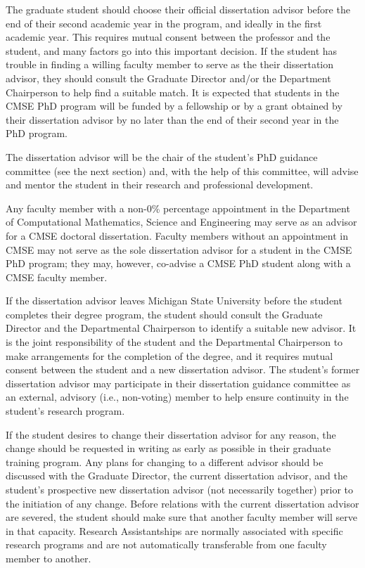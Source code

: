 The graduate student should choose their official dissertation advisor
before the end of their second academic year in the program, and
ideally in the first academic year.  This requires mutual consent
between the professor and the student, and many factors go into this
important decision.  If the student has trouble in finding a willing
faculty member to serve as the their dissertation advisor, they should
consult the Graduate Director and/or the Department Chairperson to
help find a suitable match.  It is expected that students in the CMSE
PhD program will be funded by a fellowship or by a grant obtained by
their dissertation advisor by no later than the end of their second
year in the PhD program.

The dissertation advisor will be the chair of the student's PhD
guidance committee (see the next section) and, with the help of this
committee, will advise and mentor the student in their research and
professional development.  

Any faculty member with a non-0\% percentage appointment in the
Department of Computational Mathematics, Science and Engineering may
serve as an advisor for a CMSE doctoral dissertation.  Faculty members
without an appointment in CMSE may not serve as the sole dissertation
advisor for a student in the CMSE PhD program; they may, however,
co-advise a CMSE PhD student along with a CMSE faculty member.

If the dissertation advisor leaves Michigan State University before the
student completes their degree program, the student should consult
the Graduate Director and the Departmental Chairperson to identify a
suitable new advisor.  It is the joint responsibility of the
student and the Departmental Chairperson to make arrangements for the
completion of the degree, and it requires mutual consent between the
student and a new dissertation advisor.  The student's former
dissertation advisor may participate in their dissertation guidance
committee as an external, advisory (i.e., non-voting) member to help
ensure continuity in the student's research program.

If the student desires to change their dissertation advisor for any
reason, the change should be requested in writing as early as possible in their
graduate training program.  Any plans for changing to a different
advisor should be discussed with the Graduate Director, 
 the current dissertation advisor, and the student's
prospective new dissertation advisor (not necessarily together) prior
to the initiation of any change.  Before relations with the current
dissertation advisor are severed, the student should make sure that
another faculty member will serve in that capacity.  Research
Assistantships are normally associated with specific research programs
and are not automatically transferable from one faculty member to
another.

